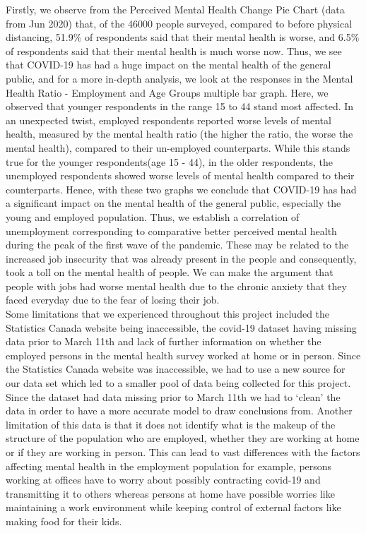 \documentclass[fontsize=11pt]{article}
\begin{document}
    Firstly, we observe from the Perceived Mental Health Change Pie Chart (data from Jun 2020) that, of the 46000 people surveyed, compared to before physical distancing, 51.9\% of respondents said that their mental health is worse, and 6.5\% of respondents said that their mental health is much worse now. Thus, we see that COVID-19 has had a huge impact on the mental health of the general public, and for a more in-depth analysis, we look at the responses in the Mental Health Ratio - Employment and Age Groups multiple bar graph. Here, we observed that younger respondents in the range 15 to 44 stand most affected. In an unexpected twist, employed respondents reported worse levels of mental health, measured by the mental health ratio (the higher the ratio, the worse the mental health), compared to their un-employed counterparts. While this stands true for the younger respondents(age 15 - 44), in the older respondents, the unemployed respondents showed worse levels of mental health compared to their counterparts. Hence, with these two graphs we conclude that COVID-19 has had a significant impact on the mental health of the general public, especially the young and employed population. Thus, we establish a correlation of unemployment corresponding to comparative better perceived mental health during the peak of the first wave of the pandemic. These may be related to the increased job insecurity that was already present in the people and consequently, took a toll on the mental health of people. We can make the argument that people with jobs had worse mental health due to the chronic anxiety that they faced everyday due to the fear of losing their job. \\

    Some limitations that we experienced throughout this project included the Statistics Canada website being inaccessible, the covid-19 dataset having missing data prior to March 11th and lack of further information on whether the employed persons in the mental health survey worked at home or in person. Since the Statistics Canada website was inaccessible, we had to use a new source for our data set which led to a smaller pool of data being collected for this project. Since the dataset had data missing prior to March 11th we had to ‘clean’ the data in order to have a more accurate model to draw conclusions from. Another limitation of this data is that it does not identify what is the makeup of the structure of the population who are employed, whether they are working at home or if they are working in person. This can lead to vast differences with the factors affecting mental health in the employment population for example,  persons working at offices have to worry about possibly contracting covid-19 and transmitting it to others whereas persons at home have possible worries like maintaining a work environment while keeping control of external factors like making food for their kids.\\
\end{document}
